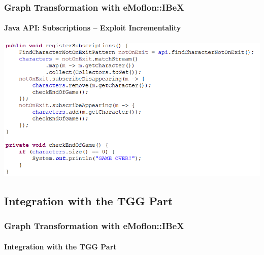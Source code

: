 	\begin{frame}
		\frametitle{Graph Transformation with eMoflon::IBeX}
		\framesubtitle{Java API: Subscriptions -- Exploit Incrementality}
		\includegraphics[width=\textwidth]{../common/code/example-subscriptions}
	\end{frame}

\subsection{Integration with the TGG Part}
	\begin{frame}
		\frametitle{Graph Transformation with eMoflon::IBeX}
		\framesubtitle{Integration with the TGG Part}
		\begin{center}
			\resizebox{\linewidth}{!}{
				
			}
		\end{center}
	\end{frame}
